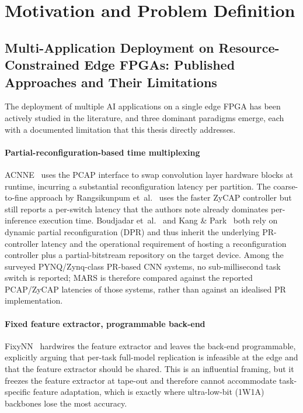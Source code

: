 \documentclass[12pt, a4paper]{report}
\numberwithin{equation}{chapter}
\numberwithin{figure}{chapter}
\numberwithin{table}{chapter}
\numberwithin{algorithm}{chapter}
\begin{document}
\section{Motivation and Problem Definition}

\subsection{Multi-Application Deployment on Resource-Constrained Edge FPGAs: Published Approaches and Their Limitations}

The deployment of multiple AI applications on a single edge FPGA has been actively studied in the literature, and three dominant paradigms emerge, each with a documented limitation that this thesis directly addresses.

\paragraph{Partial-reconfiguration-based time multiplexing} ACNNE~\cite{Huang2024ACNNE} uses the PCAP interface to swap convolution layer hardware blocks at runtime, incurring a substantial reconfiguration latency per partition. The coarse-to-fine approach by Rangsikunpum et~al.~\cite{Rangsikunpum2024CoarseToFine} uses the faster ZyCAP controller but still reports a per-switch latency that the authors note already dominates per-inference execution time. Boudjadar et~al.~\cite{Boudjadar2025DynamicFPGA} and Kang \& Park~\cite{Kang2025RuntimeRobust} both rely on dynamic partial reconfiguration (DPR) and thus inherit the underlying PR-controller latency and the operational requirement of hosting a reconfiguration controller plus a partial-bitstream repository on the target device. Among the surveyed PYNQ/Zynq-class PR-based CNN systems, no sub-millisecond task switch is reported; MARS is therefore compared against the reported PCAP/ZyCAP latencies of those systems, rather than against an idealised PR implementation.

\paragraph{Fixed feature extractor, programmable back-end} FixyNN~\cite{Whatmough2019FixyNN} hardwires the feature extractor and leaves the back-end programmable, explicitly arguing that per-task full-model replication is infeasible at the edge and that the feature extractor should be shared. This is an influential framing, but it freezes the feature extractor at tape-out and therefore cannot accommodate task-specific feature adaptation, which is exactly where ultra-low-bit (1W1A) backbones lose the most accuracy.
\end{document}

